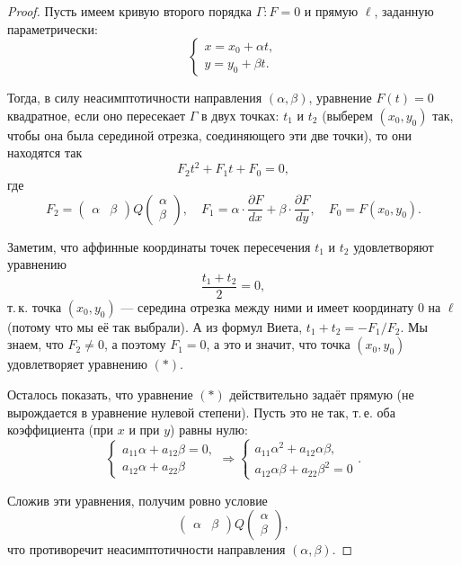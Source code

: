 \begin{proof}
    Пусть имеем кривую второго порядка $\Gamma: F = 0$ и прямую $\ell$, заданную параметрически:
    $$
    \begin{cases}
        x = x_0 + \alpha t,\\
        y = y_0 + \beta t.
    \end{cases}
    $$

    Тогда, в силу неасимптотичности направления $(\alpha, \beta)$, уравнение $F(t) = 0$ квадратное, если оно пересекает $\Gamma$ в двух точках: $t_1$ и $t_2$ (выберем $(x_0, y_0)$ так, чтобы она была серединой отрезка, соединяющего эти две точки), то они находятся так
    $$
    F_2t^2 + F_1t + F_0 = 0,
    $$
    где
    $$
    F_2 = 
    \begin{pmatrix}
        \alpha & \beta
    \end{pmatrix}
    Q
    \begin{pmatrix}
        \alpha\\\beta
    \end{pmatrix},\quad F_1 = \alpha\cdot\frac{\partial F}{dx} + \beta\cdot\frac{\partial F}{dy},\quad F_0 = F(x_0, y_0).
    $$

    Заметим, что аффинные координаты точек пересечения $t_1$ и $t_2$ удовлетворяют уравнению
    $$
    \frac{t_1 + t_2}{2} = 0,
    $$
    т.\,к. точка $(x_0, y_0)$ --- середина отрезка между ними и имеет координату $0$ на $\ell$ (потому что мы её так выбрали). А из формул Виета, $t_1 + t_2 = -F_1 / F_2$. Мы знаем, что $F_2 \ne 0$, а поэтому $F_1 = 0$, а это и значит, что точка $(x_0, y_0)$ удовлетворяет уравнению $(\ast)$.

    Осталось показать, что уравнение $(\ast)$ действительно задаёт прямую (не вырождается в уравнение нулевой степени). Пусть это не так, т.\,е. оба коэффициента (при $x$ и при $y$) равны нулю:
    $$
    \begin{cases}
        a_{11}\alpha + a_{12}\beta = 0,\\
        a_{12}\alpha + a_{22}\beta
    \end{cases} \Rightarrow
    \begin{cases}
        a_{11}\alpha^2 + a_{12}\alpha\beta,\\
        a_{12}\alpha\beta + a_{22}\beta^2 = 0
    \end{cases}.
    $$

    Сложив эти уравнения, получим ровно условие
    $$
    \begin{pmatrix}
        \alpha & \beta
    \end{pmatrix}
    Q
    \begin{pmatrix}
        \alpha\\\beta
    \end{pmatrix},
    $$
    что противоречит неасимптотичности направления $(\alpha, \beta)$.
\end{proof}

